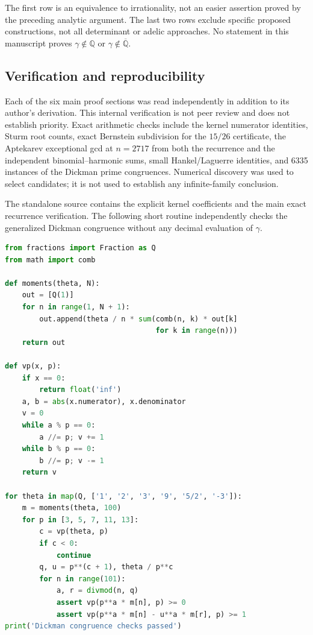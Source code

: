 \documentclass[11pt,a4paper]{article}
\theoremstyle{definition}
\theoremstyle{remark}
\numberwithin{equation}{section}
\begin{document}
The first row is an equivalence to irrationality, not an easier
assertion proved by the preceding analytic argument. The last two
rows exclude specific proposed constructions, not all determinant
or adelic approaches. No statement in this manuscript proves
$\gamma\notin\mathbb Q$ or $\gamma\notin\overline{\mathbb Q}$.

\subsection{Verification and reproducibility}
Each of the six main proof sections was read independently in
addition to its author's derivation. This internal verification is
not peer review and does not establish priority. Exact arithmetic
checks include the kernel numerator identities, Sturm root counts, exact
Bernstein subdivision for the $15/26$ certificate,
the Aptekarev exceptional gcd at $n=2717$ from both the recurrence and
the independent binomial--harmonic sums, small Hankel/Laguerre
identities, and 6335 instances of the Dickman prime congruences.
Numerical discovery was used to select candidates; it is not used
to establish any infinite-family conclusion.

The standalone source contains the explicit kernel coefficients and
the main exact recurrence verification. The following short routine
independently checks the generalized Dickman congruence without any
decimal evaluation of $\gamma$.
\begin{lstlisting}[language=Python]
from fractions import Fraction as Q
from math import comb

def moments(theta, N):
    out = [Q(1)]
    for n in range(1, N + 1):
        out.append(theta / n * sum(comb(n, k) * out[k]
                                   for k in range(n)))
    return out

def vp(x, p):
    if x == 0:
        return float('inf')
    a, b = abs(x.numerator), x.denominator
    v = 0
    while a % p == 0:
        a //= p; v += 1
    while b % p == 0:
        b //= p; v -= 1
    return v

for theta in map(Q, ['1', '2', '3', '9', '5/2', '-3']):
    m = moments(theta, 100)
    for p in [3, 5, 7, 11, 13]:
        c = vp(theta, p)
        if c < 0:
            continue
        q, u = p**(c + 1), theta / p**c
        for n in range(101):
            a, r = divmod(n, q)
            assert vp(p**a * m[n], p) >= 0
            assert vp(p**a * m[n] - u**a * m[r], p) >= 1
print('Dickman congruence checks passed')
\end{lstlisting}
\end{document}
